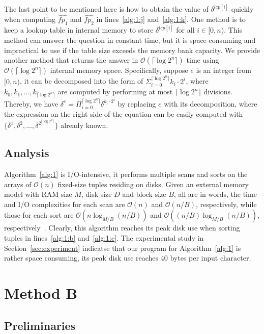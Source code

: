 \documentclass[10pt,journal,compsoc]{IEEEtran}
\begin{document}
The last point to be mentioned here is how to obtain the value of $\delta^{lcp[i]}$ quickly when computing $\hat{fp_1}$ and $\hat{fp_2}$ in lines~\ref{alg:1:j} and~\ref{alg:1:k}. One method is to keep a lookup table in internal memory to store $\delta^{lcp[i]}$ for all $i \in [0, n)$. This method can answer the question in constant time, but it is space-consuming and 
impractical to use if the table size exceeds the memory bank capacity. We provide another method that returns the answer in $\mathcal{O}(\lceil \log2^n \rceil)$ time using $\mathcal{O}(\lceil \log2^n \rceil)$ internal memory space. Specifically, suppose $e$ is an integer from $[0, n)$, it can be decomposed into the form of $\Sigma_{i = 0}^{\lceil \log2^n \rceil}{k_i \cdot 2^i}$, where $k_0, k_1, ..., k_{\lceil \log2^n \rceil}$ are computed by performing at most $\lceil \log2^n \rceil$ divisions. Thereby, we have $\delta^e = \Pi_{i = 0}^{\lceil \log2^n \rceil}{\delta}^{k_i \cdot 2^i}$ by replacing $e$ with its decomposition, where the expression on the right side of the equation can be easily computed with $\{{\delta}^{1}, {\delta}^{2}, \dots, {\delta}^{2^{\lceil \log2^n \rceil}} \}$ already known.

\subsection{Analysis} \label{sec:method1:analysis}


Algorithm~\ref{alg:1} is I/O-intensive, it performs multiple scans and sorts on the arrays of $\mathcal{O}(n)$ fixed-size tuples residing on disks. Given an external memory model with RAM size $M$, disk size $D$ and block size $B$, all are in words, the time and I/O complexities for each scan are $\mathcal{O}(n)$ and $\mathcal{O}(n / B)$, respectively, while those for each sort are $\mathcal{O}(n\log_{M/ B}(n / B))$ and $\mathcal{O}((n / B)\log_{M / B}(n / B))$, respectively~\cite{Arge2013}. Clearly, this algorithm reaches its peak disk use when sorting tuples in lines~\ref{alg:1:b} and~\ref{alg:1:e}. The experimental study in Section~\ref{sec:experiment} indicatse that our program for Algorithm~\ref{alg:1} is rather space consuming, its peak disk use reaches 40 bytes per input character.

\section{Method B} \label{sec:method2}

\subsection{Preliminaries} \label{sec:method2:preliminaries}
\end{document}
